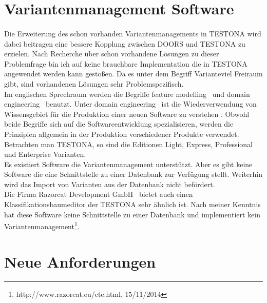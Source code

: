 \newpage
\section{Variantenmanagement Software}
\paragraph{}
Die Erweiterung des schon vorhanden Variantenmanagements in TESTONA wird dabei beitragen eine bessere Kopplung zwischen DOORS und TESTONA zu erzielen. Nach Recherche über schon vorhandene Lösungen zu dieser Problemfrage bin ich auf keine brauchbare Implementation die in TESTONA angewendet werden kann gestoßen. Da es unter dem Begriff \glqq Variante\grqq viel Freiraum gibt, sind vorhandenen Lösungen sehr Problemspezifisch.\\


Im englischen Sprechraum werden die Begriffe \glqq feature modelling\grqq~ und \glqq domain engineering\grqq~ benutzt. Unter \glqq domain engineering\grqq~ ist die Wiederverwendung von Wissensgebiet für die Produktion einer neuen Software zu verstehen \cite{DomainEng}. Obwohl beide Begriffe sich auf die Softwareentwicklung spezialisieren, werden die Prinzipien allgemein in der Produktion verschiedener Produkte verwendet. Betrachten man TESTONA, so sind die Editionen Light, Express, Professional und Enterprise Varianten.\\


Es existiert Software die Variantenmanagement unterstützt. Aber es gibt keine Software die eine Schnittstelle zu einer Datenbank zur Verfügung stellt. Weiterhin wird das Import von Varianten aus der Datenbank nicht befördert.\\


Die Firma \glqq Razorcat Development GmbH\grqq~ bietet auch einen Klassifikationsbaumeditor der TESTONA sehr ähnlich ist. Nach meiner Kenntnis hat diese Software keine Schnittstelle zu einer Datenbank und implementiert kein Variantenmanagement\footnote{http://www.razorcat.eu/cte.html, 15/11/2014}.



\newpage
\section{Neue Anforderungen}
